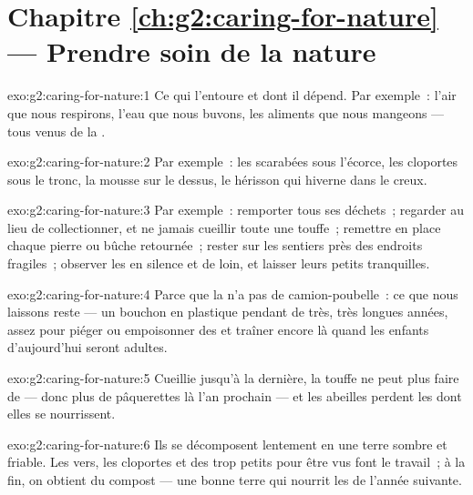 \section*{Chapitre \ref{ch:g2:caring-for-nature} --- Prendre soin de la nature}

\begin{solution}{exo:g2:caring-for-nature:1}
Ce qui l'entoure et dont il dépend. Par exemple~: l'air que nous
respirons, l'eau que nous buvons, les aliments que nous mangeons ---
tous venus de la .
\end{solution}

\begin{solution}{exo:g2:caring-for-nature:2}
Par exemple~: les scarabées sous l'écorce, les cloportes sous le
tronc, la mousse sur le dessus, le hérisson qui hiverne dans le
creux.
\end{solution}

\begin{solution}{exo:g2:caring-for-nature:3}
Par exemple~: remporter tous ses déchets~; regarder au lieu de
collectionner, et ne jamais cueillir toute une touffe~; remettre en
place chaque pierre ou bûche retournée~; rester sur les sentiers
près des endroits fragiles~; observer les  en silence et de
loin, et laisser leurs petits tranquilles.
\end{solution}

\begin{solution}{exo:g2:caring-for-nature:4}
Parce que la  n'a pas de camion-poubelle~: ce que nous
laissons reste --- un bouchon en plastique pendant de très, très
longues années, assez pour piéger ou empoisonner des  et
traîner encore là quand les enfants d'aujourd'hui seront adultes.
\end{solution}

\begin{solution}{exo:g2:caring-for-nature:5}
Cueillie jusqu'à la dernière, la touffe ne peut plus faire de
 --- donc plus de pâquerettes là l'an prochain --- et les
abeilles perdent les  dont elles se nourrissent.
\end{solution}

\begin{solution}{exo:g2:caring-for-nature:6}
Ils se décomposent lentement en une terre sombre et friable. Les
vers, les cloportes et des  trop petits pour être vus
font le travail~; à la fin, on obtient du compost --- une bonne
terre qui nourrit les  de l'année suivante.
\end{solution}


